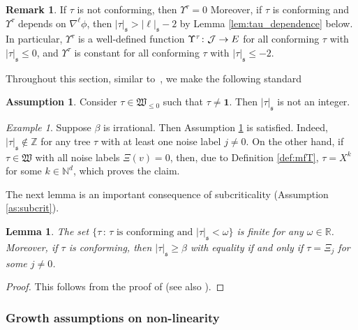 \documentclass[11pt,a4paper]{article}
\numberwithin{equation}{section}
\newtheorem{lemma}[theorem]{Lemma}
\theoremstyle{definition}
\newtheorem{remark}[theorem]{Remark}
\newtheorem{assumption}[theorem]{Assumption}
\theoremstyle{remark}
\newtheorem{example}[theorem]{Example}
\def\R{{\mathbb R}}
\def\Z{{\mathbb Z}}
\def\N{{\mathbb N}}
\newcommand{\bone}{\mathbf{1}}
\newcommand{\s}{\mathfrak{s}}
\newcommand{\mfW}{\mathfrak{W}}
\begin{document}
\begin{remark}\label{rem:dependence}
If $\tau$ is not conforming, then $\Upsilon^\tau=0$
Moreover, if $\tau$ is conforming and $\Upsilon^\tau$ depends on $\nabla^\ell\phi$, then $|\tau|_\s >|\ell|_\s-2$
by Lemma \ref{lem:tau_dependence} below.
In particular, $\Upsilon^\tau$ is a well-defined function
$
\Upsilon^\tau \colon \mathcal{J} \to E
$
for all conforming $\tau$ with $|\tau|_\s\leq0$,
and $\Upsilon^\tau$ is constant for all conforming $\tau$ with $|\tau|_\s\leq -2$.
\end{remark}

Throughout this section, similar to~\cite[Assumption 5.3]{Hairer14}, we make the following standard

\begin{assumption}\label{as:non_integer}
Consider $\tau\in\mfW_{\leq 0}$ such that $\tau\neq\bone$.
Then $|\tau|_\s$ is not an integer.
\end{assumption}

\begin{example}
Suppose $\beta$ is irrational. Then Assumption \ref{as:non_integer} is satisfied.
Indeed, $|\tau|_\s\notin\Z$ for any tree $\tau$ with at least one noise label $j\neq0$.
On the other hand, if $\tau \in\mfW$ with all noise labels $\Xi(v)=0$, then, due to Definition \ref{def:mfT}, $\tau=X^k$ for some $k\in\N^d$, which proves the claim.
\end{example}

The next lemma is an important consequence of subcriticality (Assumption \ref{as:subcrit}).

\begin{lemma}\label{lem:lowest_tree}
The set $\{\tau\,:\,\tau \text{ is conforming and } |\tau|_\s <\omega\}$ is finite for any $\omega\in\R$.
Moreover, 
if $\tau$ is conforming, then
$|\tau|_\s \geq \beta$ with equality if and only if $\tau=\Xi_j$ for some $j\neq0$.
\end{lemma}

\begin{proof}
This follows from the proof of \cite[Lem.~8.10]{Hairer14} (see also \cite[Prop.~5.15]{BHZ19}).
\end{proof}


\subsubsection{Growth assumptions on non-linearity}
\end{document}
